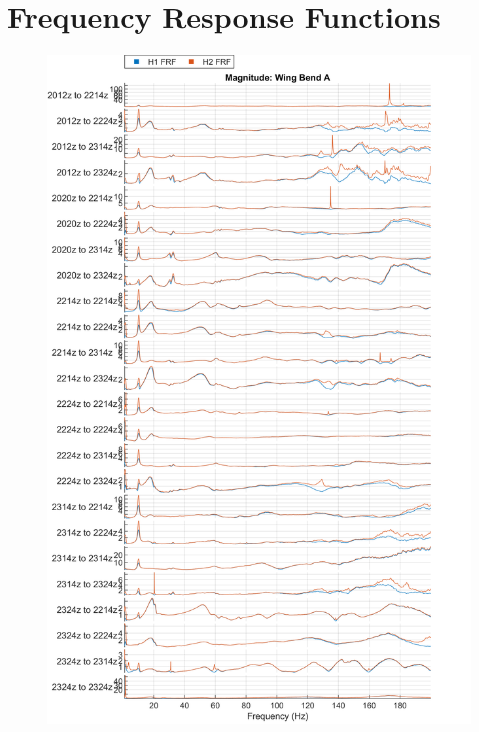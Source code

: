 \chapter{Frequency Response Functions}
\label{ch:appendix}

\begin{figure}
    \centering
    \includegraphics{figs/GVT/mag_Wing Bend A.png}
    \label{fig:mag_wingBendA}
\end{figure}

